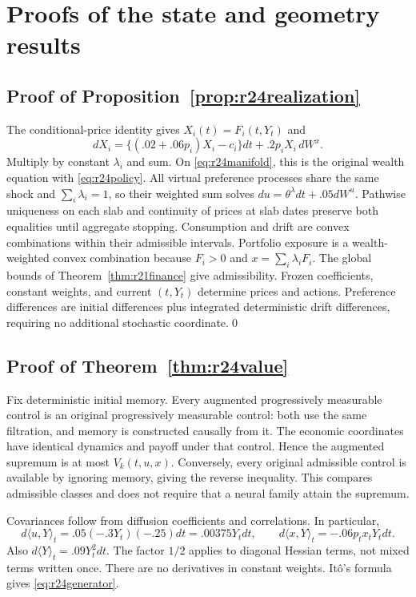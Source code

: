 \section{Proofs of the state and geometry results}\label{app:r24proofs}
\subsection{Proof of Proposition~\ref{prop:r24realization}}
The conditional-price identity gives $X_i(t)=F_i(t,Y_t)$ and
\[
 dX_i=\{(.02+.06p_i)X_i-c_i\}dt+.2p_iX_i\,dW^x.
\]
Multiply by constant $\lambda_i$ and sum. On \eqref{eq:r24manifold}, this is the original wealth equation with \eqref{eq:r24policy}. All virtual preference processes share the same shock and $\sum_i\lambda_i=1$, so their weighted sum solves $du=\theta^\lambda dt+.05dW^u$. Pathwise uniqueness on each slab and continuity of prices at slab dates preserve both equalities until aggregate stopping. Consumption and drift are convex combinations within their admissible intervals. Portfolio exposure is a wealth-weighted convex combination because $F_i>0$ and $x=\sum_i\lambda_iF_i$. The global bounds of Theorem~\ref{thm:r21finance} give admissibility. Frozen coefficients, constant weights, and current $(t,Y_t)$ determine prices and actions. Preference differences are initial differences plus integrated deterministic drift differences, requiring no additional stochastic coordinate.\qed

\subsection{Proof of Theorem~\ref{thm:r24value}}
Fix deterministic initial memory. Every augmented progressively measurable control is an original progressively measurable control: both use the same filtration, and memory is constructed causally from it. The economic coordinates have identical dynamics and payoff under that control. Hence the augmented supremum is at most $V_k(t,u,x)$. Conversely, every original admissible control is available by ignoring memory, giving the reverse inequality. This compares admissible classes and does not require that a neural family attain the supremum.

Covariances follow from diffusion coefficients and correlations. In particular,
\[
 d\langle u,Y\rangle_t=.05(-.3Y_t)(-.25)dt=.00375Y_tdt,\qquad
 d\langle x,Y\rangle_t=-.06p_tx_tY_tdt.
\]
Also $d\langle Y\rangle_t=.09Y_t^2dt$. The factor $1/2$ applies to diagonal Hessian terms, not mixed terms written once. There are no derivatives in constant weights. It\^o's formula gives \eqref{eq:r24generator}.

